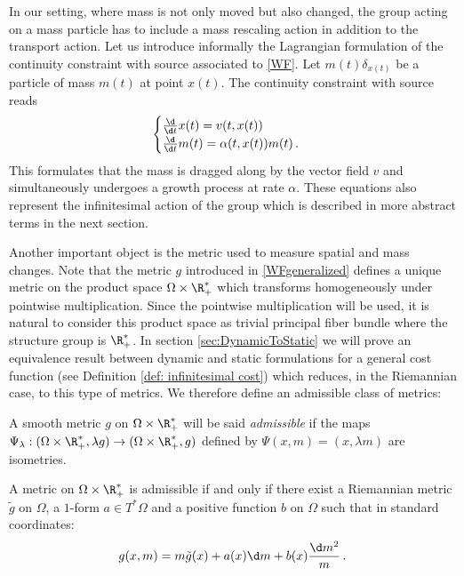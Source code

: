 In our setting, where mass is not only moved but also changed, the group acting on a mass particle has to include a mass rescaling action in addition to the transport action. Let us introduce informally the Lagrangian formulation of the continuity constraint with source associated to \eqref{WF}. Let $m(t) \delta_{x(t)}$ be a particle of mass $m(t)$ at point $x(t)$. The continuity constraint with source reads
\begin{equation}\label{ParticleFormulation}
\begin{cases}
\frac{\d}{\d t} x(t)  = v(t,x(t))\\
\frac{\d}{\d t} m(t) = \alpha(t,x(t))m(t)\,.
\end{cases}
\end{equation}
This formulates that the mass is dragged along by the vector field $v$ and simultaneously undergoes a growth process at rate $\alpha$. These equations  also represent the infinitesimal action of the group which is described in more abstract terms in the next section. 

Another important object is the metric used to measure spatial and mass changes. Note that the metric $g$ introduced in \eqref{WFgeneralized} defines a unique metric on the product space $\Omega \times \R_+^*$ which transforms homogeneously under pointwise multiplication. Since the pointwise multiplication will be used, it is natural to consider this product space as trivial principal fiber bundle where the structure group is $\R^*_+$. In section \ref{sec:DynamicToStatic} we will prove an equivalence result between dynamic and static formulations for a general cost function (see Definition \ref{def: infinitesimal cost}) which reduces, in the Riemannian case, to this type of metrics. We therefore define an admissible class of metrics:


 \begin{definition}\label{AdmissibleMetrics}
 A smooth metric $g$ on $\Omega \times \R_+^*$ will be said \textit{admissible} if 
the maps $\Psi_\lambda:(\Omega \times \R_+^*,\lambda g) \to (\Omega \times \R_+^*, g)$ defined by $\Psi(x,m)= (x,\lambda m)$ are isometries.
\end{definition}

\begin{proposition}
A metric on $\Omega \times \R_+^*$ is admissible if and only if there exist a Riemannian metric $\tilde{g}$ on $\Omega$, a $1$-form $a \in  T^*\Omega$ and a positive function $b$ on $\Omega$  such that in standard coordinates:
\begin{equation}\label{GeneralFormOfMetric}
g(x,m) = m \tilde{g}(x) + a(x)  \d m + b(x) \frac{\d m^2}{m}\,.
\end{equation}
\end{proposition}

